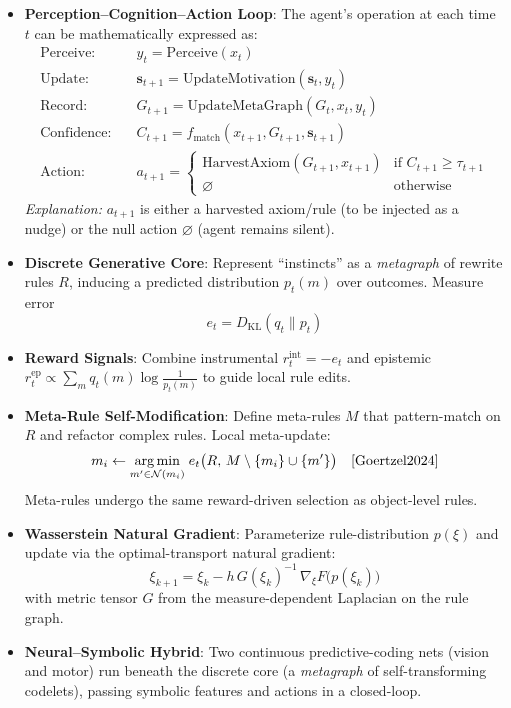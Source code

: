 \documentclass[11pt]{article}
\begin{document}
\begin{itemize}
  \item \textbf{Perception--Cognition--Action Loop}: The agent's operation at each time $t$ can be mathematically expressed as:
  \begin{align*}
    \text{Perceive:} &\quad y_t = \mathrm{Perceive}(x_t) \\
    \text{Update:} &\quad \mathbf{s}_{t+1} = \mathrm{UpdateMotivation}(\mathbf{s}_t, y_t) \\
    \text{Record:} &\quad G_{t+1} = \mathrm{UpdateMetaGraph}(G_t, x_t, y_t) \\
    \text{Confidence:} &\quad C_{t+1} = f_\mathrm{match}(x_{t+1}, G_{t+1}, \mathbf{s}_{t+1}) \\
    \text{Action:} &\quad a_{t+1} = \begin{cases}
      \mathrm{HarvestAxiom}(G_{t+1}, x_{t+1}) & \text{if } C_{t+1} \geq \tau_{t+1} \\
      \varnothing & \text{otherwise}
    \end{cases}
  \end{align*}
  \textit{Explanation:} $a_{t+1}$ is either a harvested axiom/rule (to be injected as a nudge) or the null action $\varnothing$ (agent remains silent).
  \item \textbf{Discrete Generative Core}: Represent “instincts” as a \emph{metagraph} of rewrite rules $R$, inducing a predicted distribution $p_t(m)$ over outcomes. Measure error \cite{Goertzel2024}
  \[
    e_t = D_{\mathrm{KL}}(q_t\|p_t)
  \]
  \item \textbf{Reward Signals}: Combine instrumental $r^{\mathrm{int}}_t=-e_t$ and epistemic $r^{\mathrm{ep}}_t\propto\sum_m q_t(m)\log\tfrac1{p_t(m)}$ to guide local rule edits.\cite{Goertzel2024}
  \item \textbf{Meta-Rule Self-Modification}: Define meta-rules $M$ that pattern-match on $R$ and refactor complex rules. Local meta-update:
  \[
    m_i \leftarrow \underset{m'\in\mathcal{N}(m_i)}{\arg\min}\;e_t\bigl(R,\,M\setminus\{m_i\}\cup\{m'\}\bigr)\quad\cite{Goertzel2024}
  \]
  Meta-rules undergo the same reward-driven selection as object-level rules.
  \item \textbf{Wasserstein Natural Gradient}: Parameterize rule-distribution $p(\xi)$ and update via the optimal-transport natural gradient:\cite{Goertzel2024}
  \[
    \xi_{k+1} = \xi_k - h\,G(\xi_k)^{-1}\,\nabla_{\xi}F\bigl(p(\xi_k)\bigr)
  \]
  with metric tensor $G$ from the measure-dependent Laplacian on the rule graph.
  \item \textbf{Neural–Symbolic Hybrid}: Two continuous predictive-coding nets (vision and motor) run beneath the discrete core (a \emph{metagraph} of self-transforming codelets), passing symbolic features and actions in a closed-loop.\cite{Goertzel2024}
\end{itemize}
\end{document}
